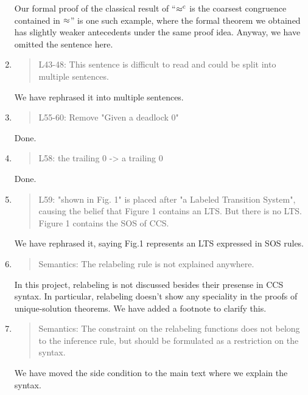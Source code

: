 \begin{enumerate}
  Our formal proof of the classical result of ``$\mathrel{\approx^{\rm{c}}}$ is the
  coarsest congruence contained in $\approx$'' is one such example, where
  the formal theorem we obtained has slightly weaker antecedents under
  the same proof idea. Anyway, we have omitted the sentence here.

\item \begin{quote}
    L43-48: This sentence is difficult to read and could be split into multiple sentences.
  \end{quote}

  We have rephrased it into multiple sentences.
  
\item \begin{quote}
    L55-60: Remove "Given a deadlock 0"
  \end{quote}
  Done.
  
\item \begin{quote}
    L58: the trailing 0 -> a trailing 0
  \end{quote}
  Done.
  
\item \begin{quote}
    L59: "shown in Fig. 1" is placed after "a Labeled Transition
    System", causing the belief that Figure 1 contains an LTS. 
    But there is no LTS. Figure 1 contains the SOS of CCS.
  \end{quote}

  We have rephrased it, saying Fig.1 represents an LTS expressed in SOS rules.

\item \begin{quote}
    Semantics: The relabeling rule is not explained anywhere.
  \end{quote}

  In this project, relabeling is not discussed besides their presense
  in CCS syntax. In particular, relabeling doesn't show any speciality
  in the proofs of unique-solution theorems.  We have added a footnote to clarify this.
  
\item \begin{quote}
    Semantics: The constraint on the relabeling functions does not belong to the inference rule, but should be formulated as a restriction on the syntax.
  \end{quote}
  We have moved the side condition to the main text where we explain
  the syntax.
  

\end{enumerate}
